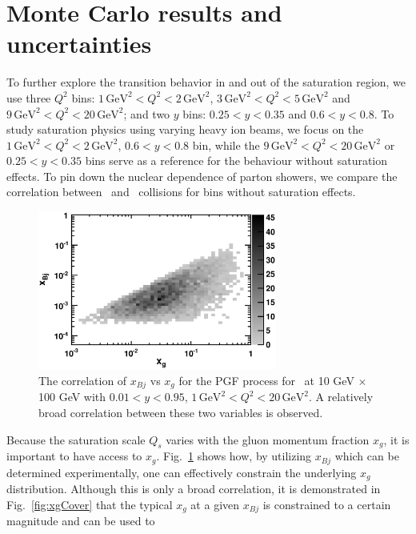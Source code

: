 \section{Monte Carlo results and uncertainties} 
 To further explore the
transition behavior in and out of the saturation region, we use three $Q^{2}$ bins:
$1\, \textrm{GeV}^{2}<Q^{2}<2 \, \mathrm{GeV}^{2}$, $3\, \textrm{GeV}^{2}<Q^{2}<5 \,
\mathrm{GeV}^{2}$ and $9\, \textrm{GeV}^{2}<Q^{2}<20 \, \mathrm{GeV}^{2}$; and two $y$ bins:
$0.25<y<0.35$ and $0.6<y<0.8$. To study saturation physics using varying heavy
ion beams, we focus on the $1\, \textrm{GeV}^{2}<Q^{2}<2 \, \mathrm{GeV}^{2}$, $0.6<y<0.8$
bin, while the $9\, \textrm{GeV}^{2}<Q^{2}<20 \, \mathrm{GeV}^{2}$ or $0.25<y<0.35$ bins serve
as a reference for the behaviour without saturation effects. To pin down the
nuclear dependence of parton showers, we compare the correlation between \ep\
and \eA\ collisions for bins without saturation effects.
\begin{figure}
\begin{center}
\includegraphics[width=0.7\textwidth]{plots/chpt6/xbjVsxg_highPtPairs_PGF_10x100_black.eps}
\end{center}
\caption[Correlation of $x_g$ and $x_{Bj}$]{The correlation of $x_{Bj}$ vs $x_{g}$ for the PGF process for \ep\ at 
10 GeV $\times$ 100 GeV with $0.01<y<0.95$, $1\, \textrm{GeV}^{2}<Q^{2}<20 \, \mathrm{GeV^{2}}$. A relatively 
broad correlation between these two variables is observed. }
\label{fig:xbjVsxg}
\end{figure}
Because the saturation scale $Q_{s}$ varies with the gluon momentum fraction
$x_{g}$, it is important to have access to $x_{g}$.
Fig.~\ref{fig:xbjVsxg} shows how, by utilizing $x_{Bj}$ which can be determined experimentally, one can
effectively constrain the underlying $x_{g}$ distribution. Although this is only
a broad correlation, it is demonstrated in Fig.~\ref{fig:xgCover} that
the typical $x_{g}$ at a given $x_{Bj}$ is constrained to a certain magnitude and can be used to
